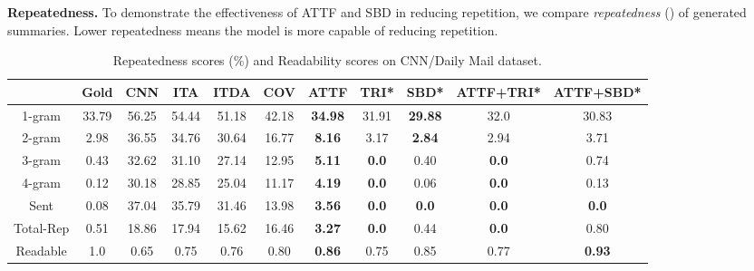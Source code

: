 \textbf{Repeatedness.}
To demonstrate the effectiveness of ATTF and SBD in reducing repetition, 
we compare \textit{repeatedness} () 
of generated summaries.
Lower repeatedness 
means the model is more capable of reducing repetition.

\begin{table}[th]
	\centering
	\scriptsize
	\begin{tabular}{|c|c|ccccc|cccc|}
		\hline
	            & Gold & CNN  & ITA & ITDA & COV & ATTF & TRI* & SBD* & ATTF+TRI* & ATTF+SBD* \\
		\hline
		1-gram & 33.79 & 56.25 & 54.44 & 51.18 & 42.18 & \bf 34.98 & 31.91 & \bf 29.88 & 32.0 & 30.83 \\
		2-gram & 2.98 & 36.55 & 34.76 & 30.64 & 16.77 & \bf 8.16 & 3.17 & \bf 2.84 & 2.94 & 3.71 \\
		3-gram & 0.43 & 32.62 & 31.10 & 27.14 & 12.95 & \bf 5.11 & \bf 0.0 & 0.40 & \bf 0.0 & 0.74 \\
		4-gram & 0.12 & 30.18 & 28.85 & 25.04 & 11.17 & \bf 4.19 & \bf 0.0 & 0.06 & \bf 0.0 & 0.13 \\
		Sent & 0.08 & 37.04 & 35.79 & 31.46 & 13.98 & \bf 3.56 & \bf 0.0 & \bf 0.0 & \bf 0.0 & \bf 0.0 \\
		\hline
		Total-Rep & 0.51 & 18.86 & 17.94 & 15.62 & 16.46 & \bf 3.27 & \bf 0.0 & 0.44 & \bf 0.0 & 0.80 \\
		\hline
		Readable & 1.0 & 0.65 & 0.75 & 0.76 & 0.80 & \bf 0.86 & 0.75 & 0.85 & 0.77 & \bf 0.93 \\
		\hline
	\end{tabular}
	\caption{Repeatedness scores (\%) and Readability scores on CNN/Daily Mail dataset.}
	\label{tab:eval_repe}
\end{table}

